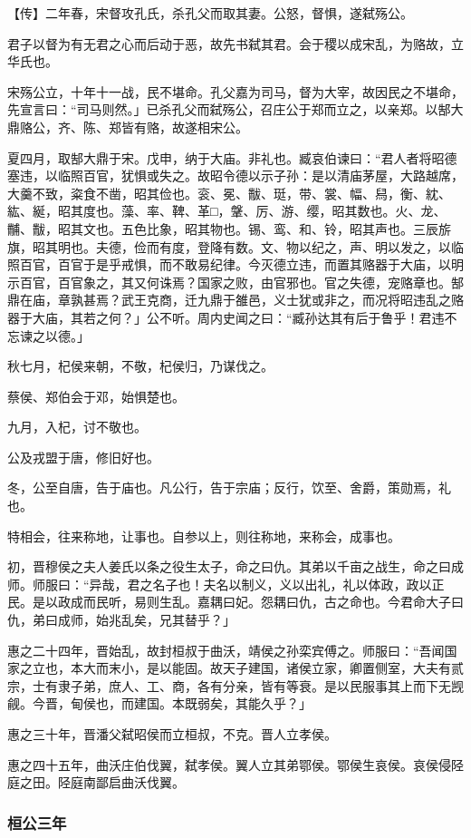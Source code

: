 \documentclass[]{article}
\begin{document}
【传】二年春，宋督攻孔氏，杀孔父而取其妻。公怒，督惧，遂弑殇公。

君子以督为有无君之心而后动于恶，故先书弑其君。会于稷以成宋乱，为赂故，立华氏也。

宋殇公立，十年十一战，民不堪命。孔父嘉为司马，督为大宰，故因民之不堪命，先宣言曰：``司马则然。」已杀孔父而弑殇公，召庄公于郑而立之，以亲郑。以郜大鼎赂公，齐、陈、郑皆有赂，故遂相宋公。

夏四月，取郜大鼎于宋。戊申，纳于大庙。非礼也。臧哀伯谏曰：``君人者将昭德塞违，以临照百官，犹惧或失之。故昭令德以示子孙：是以清庙茅屋，大路越席，大羹不致，粢食不凿，昭其俭也。衮、冕、黻、珽，带、裳、幅、舄，衡、紞、紘、綖，昭其度也。藻、率、鞞、革□，鞶、厉、游、缨，昭其数也。火、龙、黼、黻，昭其文也。五色比象，昭其物也。锡、鸾、和、铃，昭其声也。三辰旂旗，昭其明也。夫德，俭而有度，登降有数。文、物以纪之，声、明以发之，以临照百官，百官于是乎戒惧，而不敢易纪律。今灭德立违，而置其赂器于大庙，以明示百官，百官象之，其又何诛焉？国家之败，由官邪也。官之失德，宠赂章也。郜鼎在庙，章孰甚焉？武王克商，迁九鼎于雒邑，义士犹或非之，而况将昭违乱之赂器于大庙，其若之何？」公不听。周内史闻之曰：``臧孙达其有后于鲁乎！君违不忘谏之以德。」

秋七月，杞侯来朝，不敬，杞侯归，乃谋伐之。

蔡侯、郑伯会于邓，始惧楚也。

九月，入杞，讨不敬也。

公及戎盟于唐，修旧好也。

冬，公至自唐，告于庙也。凡公行，告于宗庙；反行，饮至、舍爵，策勋焉，礼也。

特相会，往来称地，让事也。自参以上，则往称地，来称会，成事也。

初，晋穆侯之夫人姜氏以条之役生太子，命之曰仇。其弟以千亩之战生，命之曰成师。师服曰：``异哉，君之名子也！夫名以制义，义以出礼，礼以体政，政以正民。是以政成而民听，易则生乱。嘉耦曰妃。怨耦曰仇，古之命也。今君命大子曰仇，弟曰成师，始兆乱矣，兄其替乎？」

惠之二十四年，晋始乱，故封桓叔于曲沃，靖侯之孙栾宾傅之。师服曰：``吾闻国家之立也，本大而末小，是以能固。故天子建国，诸侯立家，卿置侧室，大夫有贰宗，士有隶子弟，庶人、工、商，各有分亲，皆有等衰。是以民服事其上而下无觊觎。今晋，甸侯也，而建国。本既弱矣，其能久乎？」

惠之三十年，晋潘父弑昭侯而立桓叔，不克。晋人立孝侯。

惠之四十五年，曲沃庄伯伐翼，弑孝侯。翼人立其弟鄂侯。鄂侯生哀侯。哀侯侵陉庭之田。陉庭南鄙启曲沃伐翼。

\hypertarget{header-n186}{%
\subsubsection{桓公三年}\label{header-n186}}
\end{document}

